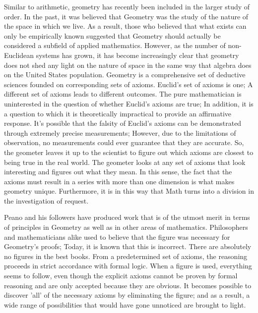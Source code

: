 \documentclass[a4paper,12pt]{book}[2004/02/16]
\theoremstyle{ilemma}
\theoremstyle{itheorem}
\theoremstyle{iother}
\theoremstyle{icorollary}
\theoremstyle{numcorollary}
\theoremstyle{idefinition}
\begin{document}
Similar to arithmetic, geometry has recently been included in the larger study of order. In the past, it was believed that Geometry was the study of the nature of the space in which we live. As a result, those who believed that what exists can only be empirically known suggested that Geometry should actually be considered a subfield of applied mathematics. However, as the number of non-Euclidean systems has grown, it has become increasingly clear that geometry does not shed any light on the nature of space in the same way that algebra does on the United States population. Geometry is a comprehensive set of deductive sciences founded on corresponding sets of axioms. Euclid's set of axioms is one; A different set of axioms leads to different outcomes. The pure mathematician is uninterested in the question of whether Euclid's axioms are true; In addition, it is a question to which it is theoretically impractical to provide an affirmative response. It's possible that the falsity of Euclid's axioms can be demonstrated through extremely precise measurements; However, due to the limitations of observation, no measurements could ever guarantee that they are accurate. So, the geometer leaves it up to the scientist to figure out which axioms are closest to being true in the real world. The geometer looks at any set of axioms that look interesting and figures out what they mean. In this sense, the fact that the axioms must result in a series with more than one dimension is what makes geometry unique.
Furthermore, it is in this way that Math turns into a division in the investigation of
request.

Peano and his followers have produced work that is of the utmost merit in terms of principles in Geometry as well as in other areas of mathematics.
Philosophers and mathematicians alike used to believe that the figure was necessary for Geometry's proofs; Today, it is known that this is incorrect. There are absolutely no figures in the best books. From a predetermined set of axioms, the reasoning proceeds in strict accordance with formal logic. When a figure is used, everything seems to follow, even though the explicit axioms cannot be proven by formal reasoning and are only accepted because they are obvious. It becomes possible to discover 'all' of the necessary axioms by eliminating the figure; and as a result, a wide range of possibilities that would have gone unnoticed are brought to light.
\end{document}

